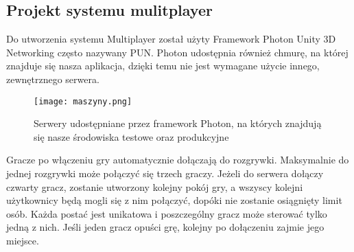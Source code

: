 \subsection{Projekt systemu mulitplayer}
Do utworzenia systemu Multiplayer został użyty Framework Photon Unity 3D Networking często nazywany PUN. 
Photon udostępnia również chmurę, na której znajduje się nasza aplikacja, dzięki temu nie jest wymagane użycie innego, zewnętrznego serwera. 
\begin{figure}[H]
	\center
	\texttt{[image: maszyny.png]}
	\caption{Serwery udostępniane przez framework Photon, na których znajdują się nasze środowiska testowe oraz produkcyjne}
\end{figure}
Gracze po włączeniu gry automatycznie dołączają do rozgrywki. Maksymalnie do jednej rozgrywki może połączyć się trzech graczy. Jeżeli do serwera dołączy czwarty gracz, zostanie utworzony kolejny pokój gry, a wszyscy kolejni użytkownicy będą mogli się z nim połączyć, dopóki nie zostanie osiągnięty limit osób. 
Każda postać jest unikatowa i poszczególny gracz może sterować tylko jedną z nich. Jeśli jeden gracz opuści grę, kolejny po dołączeniu zajmie jego miejsce. 